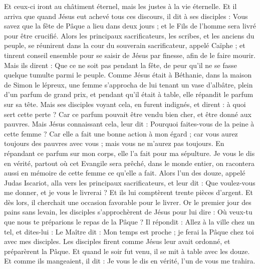 \begin{multicols}{2}
Et ceux-ci iront au châtiment éternel, mais les justes à la vie éternelle.
\VerseOne{}Et il arriva que quand Jésus eut achevé tous ces discours, il dit à ses disciples :
Vous savez que la fête de Pâque a lieu dans deux jours ; et le Fils de l'homme sera livré pour être crucifié.
Alors les principaux sacrificateurs, les scribes, et les anciens du peuple, se réunirent dans la cour du souverain sacrificateur, appelé Caïphe ;
et tinrent conseil ensemble pour se saisir de Jésus par finesse, afin de le faire mourir.
Mais ils dirent : Que ce ne soit pas pendant la fête, de peur qu'il ne se fasse quelque tumulte parmi le peuple.
Comme Jésus était à Béthanie, dans la maison de Simon le lépreux,
une femme s'approcha de lui tenant un vase d'albâtre, plein d'un parfum de grand prix, et pendant qu'il était à table, elle répandit le parfum sur sa tête.
Mais ses disciples voyant cela, en furent indignés, et dirent : à quoi sert cette perte ?
Car ce parfum pouvait être vendu bien cher, et être donné aux pauvres.
Mais Jésus connaissant cela, leur dit : Pourquoi faites-vous de la peine à cette femme ? Car elle a fait une bonne action à mon égard ;
car vous aurez toujours des pauvres avec vous ; mais vous ne m'aurez pas toujours.
En répandant ce parfum sur mon corps, elle l'a fait pour ma sépulture.
Je vous le dis en vérité, partout où cet Evangile sera prêché, dans le monde entier, on racontera aussi en mémoire de cette femme ce qu'elle a fait.
Alors l'un des douze, appelé Judas Iscariot, alla vers les principaux sacrificateurs,
et leur dit : Que voulez-vous me donner, et je vous le livrerai ? Et ils lui comptèrent trente pièces d'argent.
Et dès lors, il cherchait une occasion favorable pour le livrer.
Or le premier jour des pains sans levain, les disciples s'approchèrent de Jésus pour lui dire : Où veux-tu que nous te préparions le repas de la Pâque ?
Il répondit : Allez à la ville chez un tel, et dites-lui : Le Maître dit : Mon temps est proche ; je ferai la Pâque chez toi avec mes disciples.
Les disciples firent comme Jésus leur avait ordonné, et préparèrent la Pâque.
Et quand le soir fut venu, il se mit à table avec les douze.
Et comme ils mangeaient, il dit : Je vous le dis en vérité, l'un de vous me trahira.

\end{multicols}
